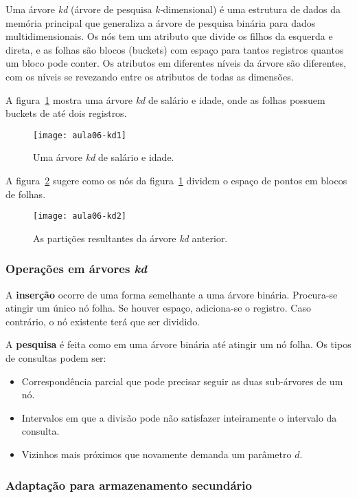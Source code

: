 Uma árvore \emph{kd} (árvore de pesquisa \emph{k-}dimensional) é uma estrutura
de dados da memória principal que generaliza a árvore de pesquisa binária 
para dados multidimensionais.
Os nós tem um atributo que divide os filhos da esquerda e direta, e as folhas
são blocos (buckets) com espaço para tantos registros quantos um bloco pode
conter.
Os atributos em diferentes níveis da árvore são diferentes, com os níveis se 
revezando entre os atributos de todas as dimensões.

A figura~\ref{aula06:fig:kd1} mostra uma árvore \emph{kd} de salário e idade,
onde as folhas possuem buckets de até dois registros.
%
\begin{figure}[!htb]
\centering
\texttt{[image: aula06-kd1]}
\caption{Uma árvore \emph{kd} de salário e idade.}
\label{aula06:fig:kd1}
\end{figure}

A figura~\ref{aula06:fig:kd2} sugere como os nós da
figura~\ref{aula06:fig:kd1} dividem o espaço de pontos em blocos de folhas.
%
\begin{figure}[!htb]
\centering
\texttt{[image: aula06-kd2]}
\caption{As partições resultantes da árvore \emph{kd} anterior.}
\label{aula06:fig:kd2}
\end{figure}

\subsubsection{Operações em árvores \emph{kd}}

A \textbf{inserção} ocorre de uma forma semelhante a uma árvore binária. Procura-se
atingir um único nó folha. Se houver espaço, adiciona-se o registro. 
Caso contrário, o nó existente terá que ser dividido.

A \textbf{pesquisa} é feita como em uma árvore binária até atingir um nó folha.
Os tipos de consultas podem ser:
\begin{itemize}
\item Correspondência parcial que pode precisar seguir as duas sub-árvores de um nó.
\item Intervalos em que a divisão pode não satisfazer inteiramente o intervalo da consulta.
\item Vizinhos mais próximos que novamente demanda um parâmetro $d$.
\end{itemize}

\subsubsection{Adaptação para armazenamento secundário}

